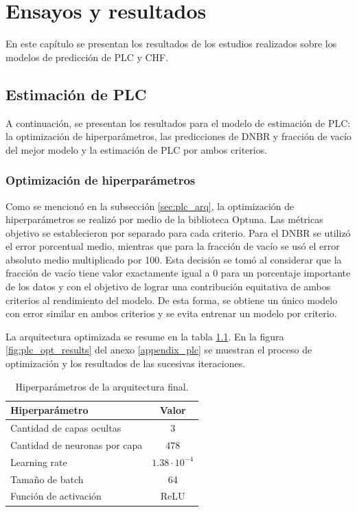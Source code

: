 
\chapter{Ensayos y resultados} %
\label{Chapter4}
En este capítulo se presentan los resultados de los estudios realizados sobre los modelos de predicción de PLC y CHF. 

\section{Estimación de PLC}
\label{sec:results_plc}
A continuación, se presentan los resultados para el modelo de estimación de PLC: la optimización de hiperparámetros, las predicciones de DNBR y fracción de vacío del mejor modelo y la estimación de PLC por ambos criterios.

\subsection{Optimización de hiperparámetros}
Como se mencionó en la subsección \ref{sec:plc_arq}, la optimización de hiperparámetros se realizó por medio de la biblioteca Optuna. Las métricas objetivo se establecieron por separado para cada criterio. Para el DNBR se utilizó el error porcentual medio, mientras que para la fracción de vacío se usó el error absoluto medio multiplicado por 100. Esta decisión se tomó al considerar que la fracción de vacío tiene valor exactamente igual a 0 para un porcentaje importante de los datos y con el objetivo de lograr una contribución equitativa de ambos criterios al rendimiento del modelo. De esta forma, se obtiene un único modelo con error similar en ambos criterios y se evita entrenar un modelo por criterio.

La arquitectura optimizada se resume en la tabla \ref{tab:plc_arq_hp}. En la figura \ref{fig:plc_opt_results} del anexo \ref{appendix_plc} se muestran el proceso de optimización y los resultados de las sucesivas iteraciones.

\begin{table}[H]
	\centering
	\caption{Hiperparámetros de la arquitectura final.}
	\begin{tabular}{l c}    
        \toprule
        \textbf{Hiperparámetro} & \textbf{Valor} \\
        \hline
        Cantidad de capas ocultas & $3$ \\
        Cantidad de neuronas por capa & $478$ \\
        Learning rate & $1.38 \cdot 10^{-4}$ \\
        Tamaño de batch & 64 \\
        Función de activación & ReLU \\
		\bottomrule
	\end{tabular}
	\label{tab:plc_arq_hp}
\end{table}

